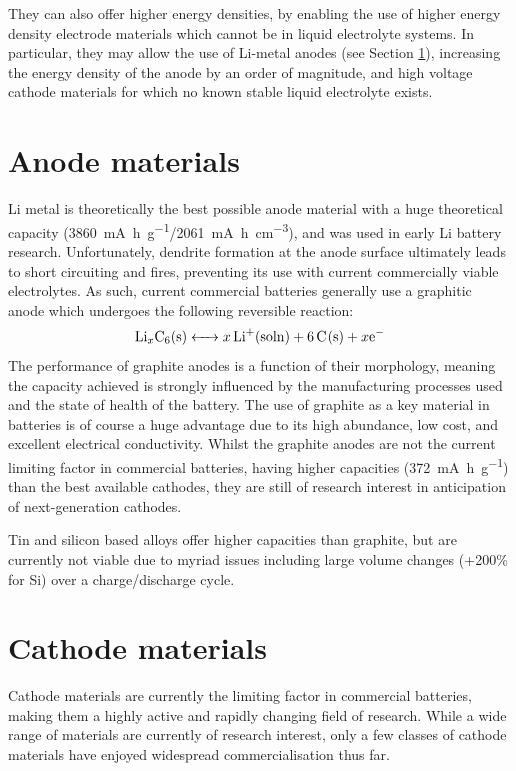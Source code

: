 They can also offer higher energy densities, by enabling the use of higher energy density electrode materials which cannot be in liquid electrolyte systems.
In particular, they may allow the use of Li-metal anodes (see Section \ref{sec:anodes}), increasing the energy density of the anode by an order of magnitude,\cite{Zhang2018} and high voltage cathode materials for which no known stable liquid electrolyte exists.

\section{Anode materials}
\label{sec:anodes}
Li metal is theoretically the best possible anode material with a huge theoretical capacity (\SI{3860}{\milli\ampere\hour\per\gram}/\SI{2061}{\milli\ampere\hour\per\centi\meter\cubed}), and was used in early Li battery research. 
Unfortunately, dendrite formation at the anode surface ultimately leads to short circuiting and fires, preventing its use with current commercially viable electrolytes. \cite{Cheng2017,Guo2017a,Lin2017,Placke2017}
As such, current commercial batteries generally use a graphitic anode which undergoes the following reversible reaction:\cite{Islam2014}
\begin{equation}
\ce{Li_xC6(s) <-> $x$Li+(soln) +6C(s) + $x$e-}
\end{equation}
The performance of graphite anodes is a function of their morphology,\cite{Buqa2005} meaning the capacity achieved is strongly influenced by the manufacturing processes used and the state of health of the battery.
The use of graphite as a key material in batteries is of course a huge advantage due to its high abundance, low cost, and excellent electrical conductivity.
Whilst the graphite anodes are not the current limiting factor in commercial batteries, having higher capacities (\SI{372}{\milli\ampere\hour\per\gram}) than the best available cathodes, they are still of research interest in anticipation of next-generation cathodes.

Tin and silicon based alloys offer higher capacities than graphite, but are currently not viable due to myriad issues including large volume changes (+200\% for Si) over a charge/discharge cycle.\cite{Scrosati2011}

\newpage
\section{Cathode materials}
Cathode materials are currently the limiting factor in commercial batteries, making them a highly active and rapidly changing field of research.\cite{Marom2011}
While a wide range of materials are currently of research interest, only a few classes of cathode materials have enjoyed widespread commercialisation thus far.

